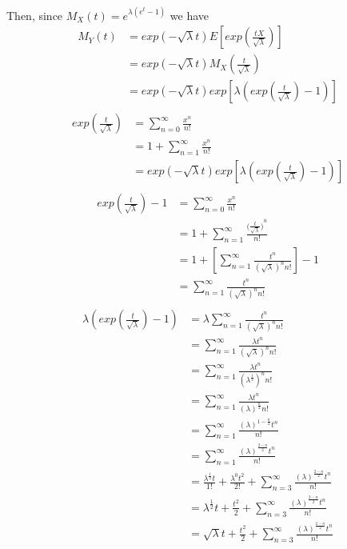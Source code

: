\documentclass[11pt]{article}
\begin{document}
Then, since $M_X(t)=e^{\lambda( e^t-1)}$ we have
\begin{align*}
M_Y(t)&=exp(-\sqrt{\lambda}t)E[exp(\frac{tX}{\sqrt{\lambda}})]\\	
	&=exp(-\sqrt{\lambda}t)  M_X(\frac{t}{\sqrt{\lambda}})\\ 
	&=exp(-\sqrt{\lambda}t)  exp[\lambda(exp(\frac{t}{\sqrt{\lambda}})-1)]\\ 
\end{align*}
\begin{align*}
exp(\frac{t}{\sqrt{\lambda}})&=\sum_{n=0}^{\infty} \frac{x^n}{n!}\\	
	&=1+\sum_{n=1}^{\infty} \frac{x^n}{n!}\\ 
	&=exp(-\sqrt{\lambda}t)  exp[\lambda(exp(\frac{t}{\sqrt{\lambda}})-1)]\\ 
\end{align*}
\begin{align*}
exp(\frac{t}{\sqrt{\lambda}})-1&=\sum_{n=0}^{\infty} \frac{x^n}{n!}\\	
	&=1+\sum_{n=1}^{\infty} \frac{({\frac{t}{\sqrt{\lambda}})}^{n}}{n!}\\ 
	&=1+[\sum_{n=1}^{\infty} \frac{t^n}{ {(\sqrt{\lambda})}^n n!}]-1\\
	&=\sum_{n=1}^{\infty} \frac{t^n}{ {(\sqrt{\lambda})}^n n!}\\ 
\end{align*}
\begin{align*}
\lambda(exp(\frac{t}{\sqrt{\lambda}})-1)&=\lambda\sum_{n=1}^{\infty} \frac{t^n}{ {(\sqrt{\lambda})}^n n!}\\
&=\sum_{n=1}^{\infty} \frac{\lambda t^n}{ {(\sqrt{\lambda})}^n n!}\\	
&=\sum_{n=1}^{\infty} \frac{\lambda t^n}{ {({\lambda}^ \frac{1}{2})}^n n!}\\
&=\sum_{n=1}^{\infty} \frac{\lambda t^n}{ {({\lambda} )}^\frac{n}{2} n!}\\
&=\sum_{n=1}^{\infty} \frac{{({\lambda} )}^{1-{\frac{n}{2}}} t^n}{  n!}\\
&=\sum_{n=1}^{\infty} \frac{{({\lambda} )}^{\frac{2-n}{2}} t^n}{  n!}\\
&=\frac{{\lambda}^{\frac{1}{2}}t}{1!} + \frac{{\lambda}^{0}t^2}{2!} +\sum_{n=3}^{\infty} \frac{{({\lambda} )}^{\frac{2-n}{2}} t^n}{  n!}\\
&={\lambda}^{\frac{1}{2}}t +\frac{t^2}{2}+ \sum_{n=3}^{\infty} \frac{{({\lambda} )}^{\frac{2-n}{2}} t^n}{  n!}\\
&=\sqrt{\lambda}t +\frac{t^2}{2}+ \sum_{n=3}^{\infty} \frac{{({\lambda} )}^{\frac{2-n}{2}} t^n}{  n!}\\
\end{align*}
\end{document}
